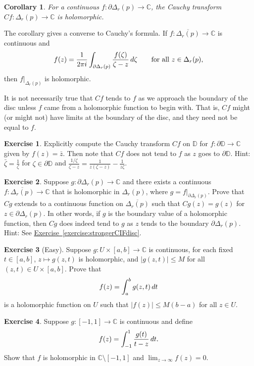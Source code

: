 \documentclass[12pt,openany]{book}
\newcommand{\avoidbreak}{\postdisplaypenalty=100}
\newcommand{\sabs}[1]{\lvert {#1} \rvert}
\newcommand{\C}{{\mathbb{C}}}
\newcommand{\D}{{\mathbb{D}}}
\theoremstyle{plain}
\newtheorem{cor}[thm]{Corollary}
\theoremstyle{remark}
\theoremstyle{definition}
\newenvironment{exbox}{%
    \def\FrameCommand{\vrule width 1pt \relax\hspace{10pt}}%
    \MakeFramed{\advance\hsize-\width\FrameRestore}%
}{%
    \endMakeFramed
}
\theoremstyle{exercise}
\newtheorem{exercise}{Exercise}[section]
\theoremstyle{example}
\newcommand{\exerciseref}[1]{\hyperref[#1]{Exercise~\ref*{#1}}}
\begin{document}
\begin{cor}
For a continuous $f \colon \partial \Delta_r(p) \to \C$,
the Cauchy transform $Cf \colon \Delta_r(p) \to \C$ is holomorphic.
\end{cor}

The corollary gives a converse to Cauchy's formula.
If $f \colon \overline{\Delta_r(p)} \to \C$ is continuous and
\begin{equation*}
f(z) =
\frac{1}{2\pi i}
\int_{\partial \Delta_r(p)} \frac{f(\zeta)}{\zeta-z} \, d\zeta
\qquad \text{for all } z \in \Delta_r(p),
\avoidbreak
\end{equation*}
then $f|_{\Delta_r(p)}$ is holomorphic.

It is not necessarily true that $Cf$ tends to $f$ as we approach the
boundary of the disc unless $f$ came from 
a holomorphic function to begin with.  That is, $Cf$ might (or might not) have limits at
the boundary of the disc, and they need not be equal to $f$.


\begin{exbox}
\begin{exercise}
Explicitly compute
the Cauchy transform $Cf$ on $\D$ for $f \colon \partial \D \to \C$
given by $f(z) = \bar{z}$.  Then note that $Cf$ does not tend to $f$
as $z$ goes to $\partial \D$.
Hint: $\bar{\zeta} = \frac{1}{\zeta}$ for
$\zeta \in \partial \D$
and $\frac{1/\zeta}{\zeta-z} = \frac{1}{z(\zeta-z)} - \frac{1}{z \zeta}$.
\end{exercise}

\begin{exercise}
Suppose $g \colon \partial \Delta_r(p) \to \C$ and
there exists a continuous
$f \colon \overline{\Delta_r(p)} \to \C$ that is
holomorphic in $\Delta_r(p)$, where $g = f|_{\partial \Delta_r(p)}$.
Prove that $Cg$ extends to a
continuous function on $\overline{\Delta_r(p)}$ such that
$Cg(z) = g(z)$ for $z \in \partial \Delta_r(p)$.
In other words, if $g$ is
the boundary value of a holomorphic function, then $Cg$ does indeed tend to
$g$ as $z$ tends to the boundary $\partial \Delta_r(p)$.
Hint: See \exerciseref{exercise:strongerCIFdisc}.
\end{exercise}

\begin{exercise}[Easy]
Suppose $g \colon U \times [a,b] \to \C$ is continuous, 
for each fixed $t \in [a,b]$, $z\mapsto g(z,t)$ is holomorphic,
and $\sabs{g(z,t)} \leq M$ for all $(z,t) \in U \times
[a,b]$.  Prove that
\begin{equation*}
f(z) = \int_a^b g(z,t)  \, dt
\avoidbreak
\end{equation*}
is a holomorphic function on $U$
such that $\sabs{f(z)} \leq M(b-a)$ for all $z \in U$.
\end{exercise}

\begin{exercise}
Suppose $g \colon [-1,1] \to \C$ is continuous and define
\begin{equation*}
f(z) = \int_{-1}^1 \frac{g(t)}{t-z} \, dt .
\avoidbreak
\end{equation*}
Show that $f$ is holomorphic in $\C \setminus [-1,1]$ and
$\lim_{z \to \infty} f(z) = 0$.
\end{exercise}
\end{exbox}
\end{document}
